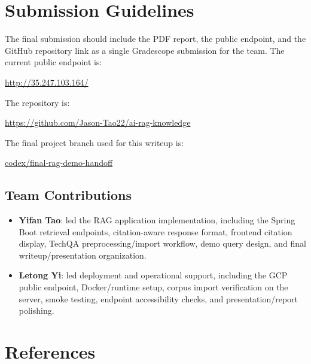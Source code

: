 \documentclass[paper=a4, fontsize=11pt]{scrartcl}
\begin{document}
\section{Submission Guidelines}

The final submission should include the PDF report, the public endpoint, and the GitHub repository link as a single Gradescope submission for the team. The current public endpoint is:

\begin{center}
\href{http://35.247.103.164/}{http://35.247.103.164/}
\end{center}

The repository is:

\begin{center}
\href{https://github.com/Jason-Tao22/ai-rag-knowledge}{https://github.com/Jason-Tao22/ai-rag-knowledge}
\end{center}

The final project branch used for this writeup is:

\begin{center}
\href{https://github.com/Jason-Tao22/ai-rag-knowledge/tree/codex/final-rag-demo-handoff}{codex/final-rag-demo-handoff}
\end{center}

\subsection*{Team Contributions}

\begin{itemize}[leftmargin=*]
    \item \textbf{Yifan Tao}: led the RAG application implementation, including the Spring Boot retrieval endpoints, citation-aware response format, frontend citation display, TechQA preprocessing/import workflow, demo query design, and final writeup/presentation organization.
    \item \textbf{Letong Yi}: led deployment and operational support, including the GCP public endpoint, Docker/runtime setup, corpus import verification on the server, smoke testing, endpoint accessibility checks, and presentation/report polishing.
\end{itemize}

\section*{References}
\end{document}
